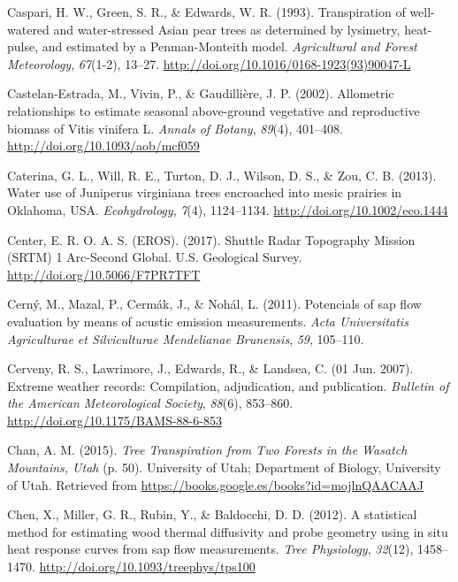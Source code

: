 \documentclass[11pt,twoside]{reedthesis}
\begin{document}
\hypertarget{ref-Caspari1993}{}
Caspari, H. W., Green, S. R., \& Edwards, W. R. (1993). Transpiration of
well-watered and water-stressed Asian pear trees as determined by
lysimetry, heat-pulse, and estimated by a Penman-Monteith model.
\emph{Agricultural and Forest Meteorology}, \emph{67}(1-2), 13--27.
\url{http://doi.org/10.1016/0168-1923(93)90047-L}

\hypertarget{ref-Castelan-Estrada2002}{}
Castelan-Estrada, M., Vivin, P., \& Gaudillière, J. P. (2002).
Allometric relationships to estimate seasonal above-ground vegetative
and reproductive biomass of Vitis vinifera L. \emph{Annals of Botany},
\emph{89}(4), 401--408. \url{http://doi.org/10.1093/aob/mcf059}

\hypertarget{ref-Caterina2014}{}
Caterina, G. L., Will, R. E., Turton, D. J., Wilson, D. S., \& Zou, C.
B. (2013). Water use of Juniperus virginiana trees encroached into mesic
prairies in Oklahoma, USA. \emph{Ecohydrology}, \emph{7}(4), 1124--1134.
\url{http://doi.org/10.1002/eco.1444}

\hypertarget{ref-earth_resources_observation_and_science_eros_center_shuttle_2017}{}
Center, E. R. O. A. S. (EROS). (2017). Shuttle Radar Topography Mission
(SRTM) 1 Arc-Second Global. U.S. Geological Survey.
\url{http://doi.org/10.5066/F7PR7TFT}

\hypertarget{ref-Cern2011}{}
Cerný, M., Mazal, P., Cermák, J., \& Nohál, L. (2011). Potencials of sap
flow evaluation by means of acustic emission measurements. \emph{Acta
Universitatis Agriculturae et Silviculturae Mendelianae Brunensis},
\emph{59}, 105--110.

\hypertarget{ref-Cerveny2007}{}
Cerveny, R. S., Lawrimore, J., Edwards, R., \& Landsea, C. (01 Jun.
2007). Extreme weather records: Compilation, adjudication, and
publication. \emph{Bulletin of the American Meteorological Society},
\emph{88}(6), 853--860. \url{http://doi.org/10.1175/BAMS-88-6-853}

\hypertarget{ref-Chan2015}{}
Chan, A. M. (2015). \emph{Tree Transpiration from Two Forests in the
Wasatch Mountains, Utah} (p. 50). University of Utah; Department of
Biology, University of Utah. Retrieved from
\url{https://books.google.es/books?id=mojlnQAACAAJ}

\hypertarget{ref-Chen2012}{}
Chen, X., Miller, G. R., Rubin, Y., \& Baldocchi, D. D. (2012). A
statistical method for estimating wood thermal diffusivity and probe
geometry using in situ heat response curves from sap flow measurements.
\emph{Tree Physiology}, \emph{32}(12), 1458--1470.
\url{http://doi.org/10.1093/treephys/tps100}
\end{document}
